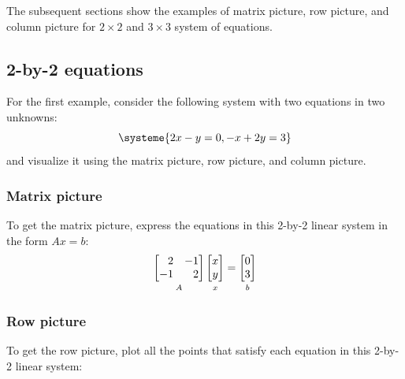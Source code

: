 \documentclass[../main.tex]{subfiles}
\begin{document}
The subsequent sections show the examples of matrix picture, row picture, and column picture for \(2 \times 2\) and \(3 \times 3\) system of equations.


\subsection{2-by-2 equations}
For the first example, consider the following system with two equations in two unknowns:
\[
    \systeme{2x - y = 0, -x + 2y = 3}
\]
and visualize it using the matrix picture, row picture, and column picture.

\subsubsection{Matrix picture}
To get the matrix picture, express the equations in this 2-by-2 linear system in the form \(Ax = b\):
\[
    \underbracket[0pt][0pt]{
        \begin{bmatrix*}[r]
            2 & -1 \\
            -1 & 2
        \end{bmatrix*}
    }_{\mathstrut A}
    \underbracket[0pt][0pt]{
        \begin{bmatrix*}
            x \\
            y
        \end{bmatrix*}
    }_{\mathstrut x}
    =
    \underbracket[0pt][0pt]{
        \begin{bmatrix*}
            0 \\
            3
        \end{bmatrix*}
    }_{\mathstrut b}
\]

\subsubsection{Row picture}
To get the row picture, plot all the points that satisfy each equation in this 2-by-2 linear system:
\end{document}
